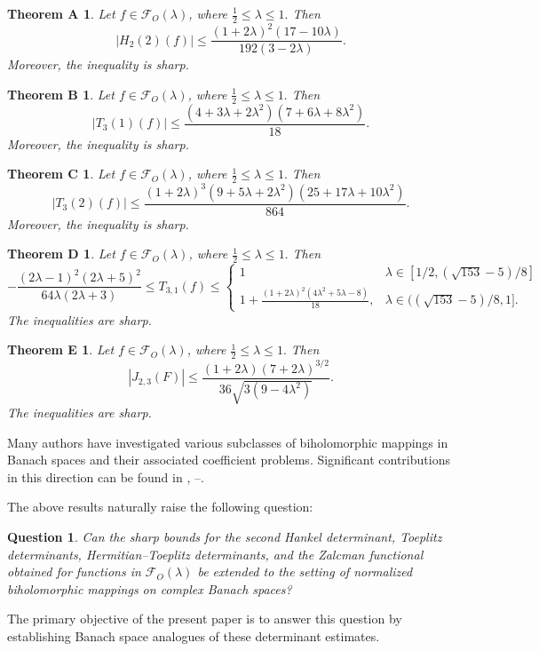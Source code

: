\documentclass[11pt, reqno]{amsart}
\newtheorem{ques}{Question}[section]
\newtheorem*{theoA}{Theorem A}
\newtheorem*{theoB}{Theorem B}
\newtheorem*{theoC}{Theorem C}
\newtheorem*{theoD}{Theorem D}
\newtheorem*{theoE}{Theorem E}
\numberwithin{equation}{section}
\begin{document}
\begin{theoA}\cite[Theorem 3.1]{ALT2022}
Let \(f\in \mathcal{F}_{O}(\lambda)\), where $\frac{1}{2}\le \lambda\le 1.$
Then
\[
\left|H_2(2)(f)\right|
\le
\frac{(1+2\lambda)^2(17-10\lambda)}
{192(3-2\lambda)}.
\]
Moreover, the inequality is sharp.
\end{theoA}
\begin{theoB}\cite[Theorem 4.2]{ALT2022}
Let \(f\in\mathcal{F}_{O}(\lambda)\), where $\frac{1}{2}\le \lambda\le 1.$
Then
\[
\left|T_3(1)(f)\right|
\le
\frac{(4+3\lambda+2\lambda^2)(7+6\lambda+8\lambda^2)}{18}.
\]
Moreover, the inequality is sharp.
\end{theoB}
\begin{theoC}\cite[Theorem 4.3]{ALT2022}
Let \(f\in\mathcal{F}_{O}(\lambda)\), where $\frac{1}{2}\le \lambda\le 1.$
Then
\[
\left|T_3(2)(f)\right|
\le
\frac{(1+2\lambda)^3(9+5\lambda+2\lambda^2)(25+17\lambda+10\lambda^2)}{864}.
\]
Moreover, the inequality is sharp.
\end{theoC}
\begin{theoD}\cite[Theorem 5.1]{ALT2022}
Let \(f\in\mathcal{F}_{O}(\lambda)\), where $\frac{1}{2}\le \lambda\le 1.$
Then
\[
-\frac{(2\lambda-1)^2(2\lambda+5)^2}{64\lambda(2\lambda+3)}\leq T_{3,1}(f)\leq  \begin{cases} 1 &\lambda\in [1/2, (\sqrt{153}-5)/8]\\
1+\frac{(1+2\lambda)^2(4\lambda^2+5\lambda-8)}{18}, &\lambda\in ((\sqrt{153}-5)/8,1].
\end{cases}
\]
 The inequalities are sharp.
\end{theoD}
\begin{theoE}\cite[Theorem 6.1]{ALT2022}
Let \(f\in\mathcal{F}_{O}(\lambda)\), where $\frac{1}{2}\le \lambda\le 1.$
Then
\[
|J_{2,3}(F)|\leq \frac{(1+2\lambda)(7+2\lambda)^{3/2}}{36\sqrt{3(9-4\lambda^2)}}.
\]
 The inequalities are sharp.
\end{theoE}

Many authors have investigated various subclasses of biholomorphic mappings in Banach spaces and their associated coefficient problems. Significant contributions in this direction can be found in \cite{Chirila2014, XL2009,GHK2002,Kohr1998}, \cite{GHKK2017}--\cite{HKK2021}.

\medskip

The above results naturally raise the following question: 
\begin{ques}Can the sharp bounds for the second Hankel determinant, Toeplitz determinants, Hermitian--Toeplitz determinants, and the Zalcman functional obtained for functions in $\mathcal{F}_{O}(\lambda)$ be extended to the setting of normalized biholomorphic mappings on complex Banach spaces?
\end{ques}
The primary objective of the present paper is to answer this question by establishing Banach space analogues of these determinant estimates.
\end{document}
